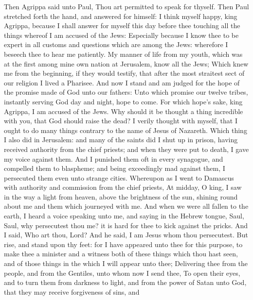 Then Agrippa said unto Paul, Thou art permitted to speak
for thyself. Then Paul stretched forth the hand, and answered for
himself:  I think myself happy, king Agrippa, because I
shall answer for myself this day before thee touching all the things
whereof I am accused of the Jews:  Especially because I know
thee to be expert in all customs and questions which are among the Jews:
wherefore I beseech thee to hear me patiently.  My manner of
life from my youth, which was at the first among mine own nation at
Jerusalem, know all the Jews;  Which knew me from the
beginning, if they would testify, that after the most straitest sect of
our religion I lived a Pharisee.  And now I stand and am
judged for the hope of the promise made of God unto our fathers:
 Unto which promise our twelve tribes, instantly serving God
day and night, hope to come. For which hope's sake, king Agrippa, I am
accused of the Jews.  Why should it be thought a thing
incredible with you, that God should raise the dead?  I
verily thought with myself, that I ought to do many things contrary to
the name of Jesus of Nazareth.  Which thing I also did in
Jerusalem: and many of the saints did I shut up in prison, having
received authority from the chief priests; and when they were put to
death, I gave my voice against them.  And I punished them
oft in every synagogue, and compelled them to blaspheme; and being
exceedingly mad against them, I persecuted them even unto strange
cities.  Whereupon as I went to Damascus with authority and
commission from the chief priests,  At midday, O king, I
saw in the way a light from heaven, above the brightness of the sun,
shining round about me and them which journeyed with me. 
And when we were all fallen to the earth, I heard a voice speaking unto
me, and saying in the Hebrew tongue, Saul, Saul, why persecutest thou
me? it is hard for thee to kick against the pricks.  And I
said, Who art thou, Lord? And he said, I am Jesus whom thou persecutest.
 But rise, and stand upon thy feet: for I have appeared
unto thee for this purpose, to make thee a minister and a witness both
of these things which thou hast seen, and of those things in the which I
will appear unto thee;  Delivering thee from the people,
and from the Gentiles, unto whom now I send thee,  To open
their eyes, and to turn them from darkness to light, and from the power
of Satan unto God, that they may receive forgiveness of sins, and
